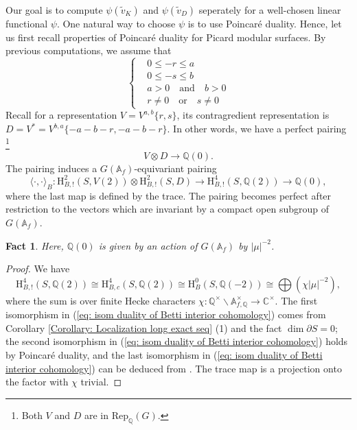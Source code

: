 \documentclass[11pt, a4paper]{amsart}
\theoremstyle{plain}
\newtheorem{fact}[theorem]{Fact}
\theoremstyle{definition}
\numberwithin{equation}{section}
\def\AAA{\mathbb{A}}
\def\CC{\mathbb{C}}
\def\QQ{\mathbb{Q}}
\begin{document}
Our goal is to compute $\psi(\tilde{v}_{K})$ and $\psi(\tilde{v}_{D})$ seperately for a well-chosen linear functional $\psi$. One natural way to choose $\psi$ is to use Poincar\'{e} duality. Hence, let us first recall properties of 
Poincar\'{e} duality for Picard modular surfaces. By previous computations, we assume that 
\begin{equation}
\label{eq: Cond of coefficients}
    \left \{
    \begin{aligned}
        & 0 \le -r \le a \\
        & 0 \le -s \le b \\
        & a > 0 \quad \text{and} \quad b > 0 \\
        &  r \neq 0 \quad \text{or} \quad s \neq 0
    \end{aligned}
    \right. 
\end{equation}
Recall for a representation $V = V^{a, b}\{r, s\}$, its contragredient representation is $D = V^{*} = V^{b, a}\{-a - b - r, -a - b -r \}$. In other words, we have a perfect pairing \footnote{Both $V$ and $D$ are in $\mathrm{Rep}_{\QQ}(G)$. }
\begin{equation*}
    V \otimes D \rightarrow \QQ(0). 
\end{equation*}
The pairing induces a $G(\AAA_{f})$-equivariant pairing 
\begin{equation*}
    \langle \cdot, \cdot \rangle_{B} \colon \mathrm{H}^{2}_{B, !}(S, V(2)) \otimes \mathrm{H}^{2}_{B, !}(S, D) \rightarrow \mathrm{H}^{4}_{B, !}(S, \QQ(2)) \rightarrow \QQ(0),
\end{equation*}
where the last map is defined by the trace. The pairing becomes perfect after restriction to the vectors which are invariant by a compact open subgroup of $G(\AAA_f)$.
\begin{fact}
    Here, $\QQ(0)$ is given by an action of $G(\AAA_f)$ by $|\mu|^{-2}$.
\end{fact}
\begin{proof}
    We have 
    \begin{equation}
    \label{eq: isom duality of Betti interior cohomology}
        \mathrm{H}^{4}_{B, !}(S, \QQ(2)) \cong  \mathrm{H}^{4}_{B, c}(S, \QQ(2)) \cong  \mathrm{H}^{0}_{B}(S, \QQ(-2)) \cong \bigoplus (\chi |\mu|^{-2}),
    \end{equation}
    where the sum is over finite Hecke characters $\chi \colon \QQ^{\times} \backslash \AAA_{f, \QQ}^{\times} \rightarrow \CC^{\times}$. The first isomorphism in (\ref{eq: isom duality of Betti interior cohomology}) comes from Corollary \ref{Corollary: Localization long exact seq} (1) and the fact $\dim \partial S = 0$; the second isomorphism in (\ref{eq: isom duality of Betti interior cohomology}) holds by Poincar\'{e} duality, and the last isomorphism in (\ref{eq: isom duality of Betti interior cohomology}) can be deduced from \cite[Theorem 5.17]{Milne17}. The trace map is a projection onto the factor with $\chi$ trivial. 
\end{proof}
\end{document}
